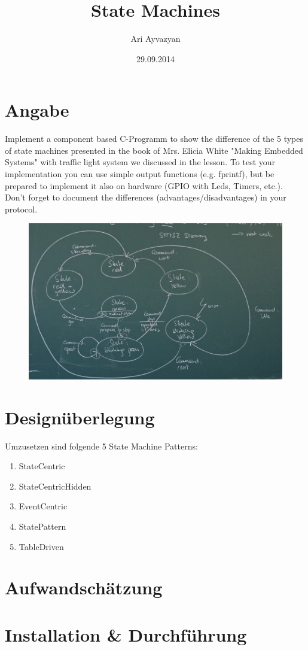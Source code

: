 \documentclass[12pt,a4paper,draft]{report}
\date{29.09.2014}
\author{Ari Ayvazyan}
\title{State Machines}
\begin{document}
\maketitle

\chapter{Angabe}
Implement a component based C-Programm to show the difference of the 5 types of state machines presented in the book of Mrs. Elicia White "Making Embedded Systems" with traffic light system we discussed in the lesson. To test your implementation you can use simple output functions (e.g. fprintf), but be prepared to implement it also on hardware (GPIO with Leds, Timers, etc.).
\newline
Don't forget to document the differences (advantages/disadvantages) in your protocol.

\begin{figure}[h]
\centering
\includegraphics[width=1\linewidth]{angabeTafel.png}
\label{fig:angabeTafel}
\end{figure}

\chapter{Designüberlegung}

Umzusetzen sind folgende 5 State Machine Patterns:
\newline
\begin{enumerate}
	\item StateCentric
	\item StateCentricHidden
	\item EventCentric
	\item StatePattern
	\item TableDriven
\end{enumerate}

\chapter{Aufwandschätzung}

\chapter{Installation \& Durchführung}
\end{document}
